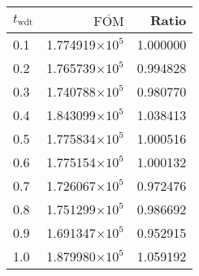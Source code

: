 \begin{tabular}{lrr}
\toprule
$t_{\mathrm{wdt}}$ & $\overline{\mathrm{FOM}}$ &    Ratio \\
\midrule
               0.1 &   1.774919$\times 10^{5}$ & 1.000000 \\
               0.2 &   1.765739$\times 10^{5}$ & 0.994828 \\
               0.3 &   1.740788$\times 10^{5}$ & 0.980770 \\
               0.4 &   1.843099$\times 10^{5}$ & 1.038413 \\
               0.5 &   1.775834$\times 10^{5}$ & 1.000516 \\
               0.6 &   1.775154$\times 10^{5}$ & 1.000132 \\
               0.7 &   1.726067$\times 10^{5}$ & 0.972476 \\
               0.8 &   1.751299$\times 10^{5}$ & 0.986692 \\
               0.9 &   1.691347$\times 10^{5}$ & 0.952915 \\
               1.0 &   1.879980$\times 10^{5}$ & 1.059192 \\
\bottomrule
\end{tabular}
